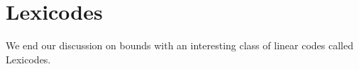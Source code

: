 \documentclass{article}
\theoremstyle{definition}
\numberwithin{exmp}{subsection}
\begin{document}

\section{Lexicodes}
We end our discussion on bounds with an interesting class of linear codes
called Lexicodes.  
\end{document}
